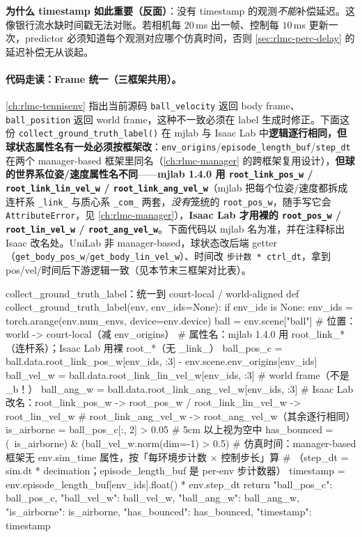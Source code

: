 \textbf{为什么 timestamp 如此重要（反面）}：没有 timestamp 的观测\emph{不能}补偿延迟。这像银行流水缺时间戳无法对账。若相机每 $20$\,ms 出一帧、控制每 $10$\,ms 更新一次，predictor 必须知道每个观测对应哪个仿真时间，否则 \cref{sec:rlmc-perc-delay} 的延迟补偿无从谈起。

\paragraph{代码走读：Frame 统一（三框架共用）。}\cref{ch:rlmc-tennisenv} 指出当前源码 \verb|ball_velocity| 返回 body frame、\verb|ball_position| 返回 world frame，这种不一致必须在 label 生成时修正。下面这份 \verb|collect_ground_truth_label()| 在 mjlab 与 Isaac Lab 中\textbf{逻辑逐行相同，但球状态属性名有一处必须按框架改}：\verb|env_origins|/\verb|episode_length_buf|/\verb|step_dt| 在两个 manager-based 框架里同名（\cref{ch:rlmc-manager} 的跨框架复用设计），\textbf{但球的世界系位姿/速度属性名不同}——\textbf{mjlab 1.4.0 用 \texttt{root\_link\_pos\_w} / \texttt{root\_link\_lin\_vel\_w} / \texttt{root\_link\_ang\_vel\_w}}（mjlab 把每个位姿/速度都拆成连杆系 \texttt{\_link\_} 与质心系 \texttt{\_com\_} 两套，\emph{没有}笼统的 \texttt{root\_pos\_w}，随手写它会 \texttt{AttributeError}，见 \cref{ch:rlmc-manager}），\textbf{Isaac Lab 才用裸的 \texttt{root\_pos\_w} / \texttt{root\_lin\_vel\_w} / \texttt{root\_ang\_vel\_w}}。下面代码以 mjlab 名为准，并在注释标出 Isaac 改名处。UniLab 非 manager-based，球状态改后端 getter（\verb|get_body_pos_w|/\verb|get_body_lin_vel_w|）、时间改 \verb|步计数 * ctrl_dt|，拿到 pos/vel/时间后下游逻辑一致（见本节末三框架对比表）。

\begin{codebox}[Python]{collect\_ground\_truth\_label：统一到 court-local / world-aligned}
def collect_ground_truth_label(env, env_ids=None):
    if env_ids is None:
        env_ids = torch.arange(env.num_envs, device=env.device)
    ball = env.scene["ball"]
    # 位置：world -> court-local（减 env_origins）
    # 属性名：mjlab 1.4.0 用 root_link_*（连杆系）；Isaac Lab 用裸 root_*（无 _link_）
    ball_pos_c = ball.data.root_link_pos_w[env_ids, :3] - env.scene.env_origins[env_ids]
    ball_vel_w = ball.data.root_link_lin_vel_w[env_ids, :3]  # world frame（不是 _b！）
    ball_ang_w = ball.data.root_link_ang_vel_w[env_ids, :3]
    # Isaac Lab 改名：root_link_pos_w -> root_pos_w / root_link_lin_vel_w -> root_lin_vel_w
    #                root_link_ang_vel_w -> root_ang_vel_w（其余逐行相同）
    is_airborne = ball_pos_c[:, 2] > 0.05                # 5cm 以上视为空中
    has_bounced = (~is_airborne) & (ball_vel_w.norm(dim=-1) > 0.5)
    # 仿真时间：manager-based 框架无 env.sim_time 属性，按「每环境步计数 × 控制步长」算
    # （step_dt = sim.dt * decimation；episode_length_buf 是 per-env 步计数器）
    timestamp = env.episode_length_buf[env_ids].float() * env.step_dt
    return {"ball_pos_c": ball_pos_c, "ball_vel_w": ball_vel_w,
            "ball_ang_w": ball_ang_w, "is_airborne": is_airborne,
            "has_bounced": has_bounced, "timestamp": timestamp}
\end{codebox}

